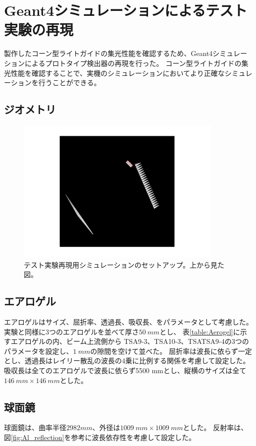 \section{Geant4シミュレーションによるテスト実験の再現}
製作したコーン型ライトガイドの集光性能を確認するため、Geant4シミュレーションによるプロトタイプ検出器の再現を行った。
コーン型ライトガイドの集光性能を確認することで、実機のシミュレーションにおいてより正確なシミュレーションを行うことができる。

\subsection{ジオメトリ}

\begin{figure}[htbp]
  \centering
  \includegraphics[width=10cm, page=1]{images/chapter4/ELPHsimulationSetup.pdf}
  \caption{テスト実験再現用シミュレーションのセットアップ。上から見た図。}
  \label{fig:ELPHsimulationSetup1}
\end{figure}

\subsection{エアロゲル}
エアロゲルはサイズ、屈折率、透過長、吸収長、をパラメータとして考慮した。
実験と同様に3つのエアロゲルを並べて厚さ$\SI{50}{mm}$とし、
表\ref{table:Aerogel}に示すエアロゲルの内、ビーム上流側から
TSA9-3、TSA10-3、TSATSA9-4の3つのパラメータを設定し、$\SI{1}{mm}$の隙間を空けて並べた。
屈折率は波長に依らず一定とし、透過長はレイリー散乱の波長の4乗に比例する関係を考慮して設定した。
吸収長は全てのエアロゲルで波長に依らず5500 mmとし、縦横のサイズは全て$\SI{146}{mm}\times\SI{146}{mm}$とした。

\subsection{球面鏡}
球面鏡は、曲率半径$2982 \si{mm}$、外径は$\SI{1009}{mm}\times\SI{1009}{mm}$とした。
反射率は、図\ref{fig:Al_reflection}を参考に波長依存性を考慮して設定した。

